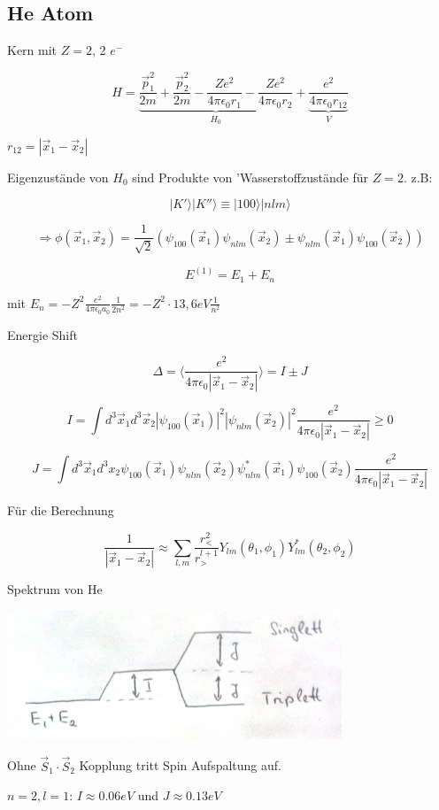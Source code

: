 \subsection{He Atom}

Kern mit \(Z=2\), 2 \(e^-\)

\[H = \underbrace{\frac{\vec p_1^2}{2m}+ \frac{\vec p_2^2}{2m}-\frac{Ze^2}{4\pi \epsilon_0 r_1} -\frac{Ze^2}{4\pi \epsilon_0 r_2}}_{H_0}+\underbrace{\frac{e^2}{4\pi\epsilon_0 r_{12}}}_{V}\]

\(r_{12}=|\vec x_1-\vec x_2|\)

Eigenzustände von \(H_0\) sind Produkte von 'Wasserstoffzustände für \(Z=2\). z.B:

\[|K'\rangle |K''\rangle \equiv |100\rangle |nlm\rangle \]

\[\Rightarrow \phi(\vec x_1,\vec x_2) = \frac{1}{\sqrt{2}}(\psi_{100}(\vec x_1)\psi_{nlm}(\vec x_2)\pm \psi_{nlm}(\vec x_1)\psi_{100}(\vec x_2) ) \]

\[E^{(1)} = E_1+E_n \]

mit \(E_n = -Z^2\frac{e^2}{4\pi\epsilon_0 a_0}\frac{1}{2n^2}=-Z^2\cdot 13,6 eV\frac{1}{n^2}\)

Energie Shift

\[\Delta = \langle \frac{e^2}{4\pi\epsilon_0|\vec x_1-\vec x_2|} \rangle = I\pm J \]

\[I = \int d^3\vec x_1 d^3\vec x_2 |\psi_{100}(\vec x_1)|^2 |\psi_{nlm}(\vec x_2)|^2 \frac{e^2}{4\pi\epsilon_0|\vec x_1-\vec x_2|} \geq 0\]


\[J=\int d^3 \vec x_1 d^3 x_2\psi_{100}(\vec x_1)\psi_{nlm}(\vec x_2) \psi_{nlm}^*(\vec x_1)\psi_{100}(\vec x_2)\frac{e^2}{4\pi\epsilon_0|\vec x_1-\vec x_2|}\]

Für die Berechnung

\[\frac{1}{|\vec x_1-\vec x_2|}\approx \sum_{l,m}\frac{r^2_<}{r^{l+1}_>}Y_{lm}(\theta_1,\phi_1)Y_{lm}^*(\theta_2,\phi_2)\]

Spektrum von He


\includegraphics[width=0.75\textwidth]{kap04_01.png}

Ohne \(\vec S_1\cdot \vec S_2\) Kopplung tritt Spin Aufspaltung auf.

\(n=2,l=1\): \(I\approx 0.06eV\) und \(J\approx 0.13eV\)




